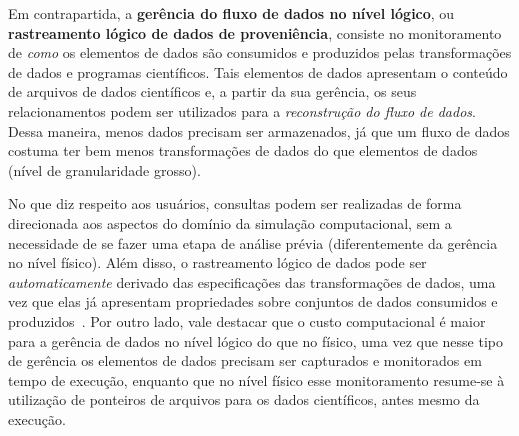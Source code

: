 Em contrapartida, a \textbf{gerência do fluxo de dados no nível lógico}, ou \textbf{rastreamento lógico de dados de proveniência}, consiste no monitoramento de \emph{como} os elementos de dados são consumidos e produzidos pelas transformações de dados e programas científicos. Tais elementos de dados apresentam o conteúdo de arquivos de dados científicos e, a partir da sua gerência, os seus relacionamentos podem ser utilizados para a \emph{reconstrução do fluxo de dados}. Dessa maneira, menos dados precisam ser armazenados, já que um fluxo de dados costuma ter bem menos transformações de dados do que elementos de dados~\cite{silva2015propostadoutorado} (nível de granularidade grosso).

No que diz respeito aos usuários, consultas podem ser realizadas de forma direcionada aos aspectos do domínio da simulação computacional, sem a necessidade de se fazer uma etapa de análise prévia (diferentemente da gerência no nível físico). Além disso, o rastreamento lógico de dados pode ser \emph{automaticamente} derivado das especificações das transformações de dados, uma vez que elas já apresentam propriedades sobre conjuntos de dados consumidos e produzidos~\cite{ikeda2013logical,silva2017raw}. Por outro lado, vale destacar que o custo computacional é maior para a gerência de dados no nível lógico do que no físico, uma vez que nesse tipo de gerência os elementos de dados precisam ser capturados e monitorados em tempo de execução, enquanto que no nível físico esse monitoramento resume-se à utilização de ponteiros de arquivos para os dados científicos, antes mesmo da execução.





